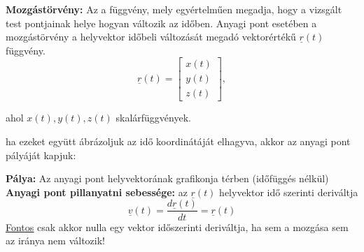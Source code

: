 \begin{tcolorbox}[colback=MidnightBlue!5!white,colframe=MidnightBlue!60!black,title= Definíció]
\textbf{Mozgástörvény:} Az a függvény, mely egyértelműen megadja, hogy a vizsgált test pontjainak helye hogyan változik az időben. Anyagi pont esetében a mozgástörvény a helyvektor időbeli változását megadó vektorértékű \(\underline{r}(t)\) függvény.
$$\underline{r}(t) = \begin{bmatrix}
    x(t)\\
    y(t)\\
    z(t)
\end{bmatrix},$$
\begin{center}
    ahol \(x(t), y(t), z(t)\) skalárfüggvények.
\end{center}
ha ezeket együtt ábrázoljuk az idő koordinátáját elhagyva, akkor az anyagi pont pályáját kapjuk:
\begin{center}
\usetikzlibrary {3d}
\end{center}
\end{tcolorbox}
\begin{tcolorbox}[colback=MidnightBlue!5!white,colframe=MidnightBlue!60!black,title= Definíció]
\textbf{Pálya:} Az anyagi pont helyvektorának grafikonja térben (időfüggés nélkül)\\
\textbf{Anyagi pont pillanyatni sebessége:} az \(\underline{r}(t)\) helyvektor idő szerinti deriváltja
$$\underline{v}(t) = \dfrac{d \underline{r}(t)}{dt} = \underline{r}(t)$$
\underline{\underline{Fontos}} csak akkor nulla egy vektor időszerinti deriváltja, ha sem a mozgása sem az iránya nem változik!
\end{tcolorbox}
